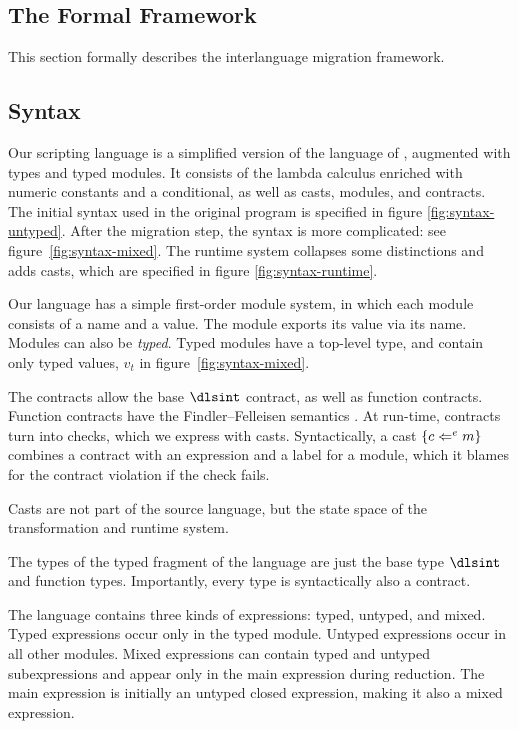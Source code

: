 \begin{schemeregion}
\section{The Formal Framework}\label{sec:dls-formal}

This section formally describes the interlanguage migration framework.
\subsection{Syntax}

Our scripting language is a simplified version of the language of
\citet{mff:popl06}, augmented with types and typed
modules.  It consists of the lambda calculus enriched with numeric
constants and a conditional, as well as casts, modules, and
contracts. The initial syntax used in the original program is specified in
figure \ref{fig:syntax-untyped}.  After the migration step, the syntax
is more complicated: see figure~\ref{fig:syntax-mixed}.  The runtime
system collapses some distinctions and adds casts, which are specified
in figure \ref{fig:syntax-runtime}.

 Our language has a simple first-order module system,
in which each module consists of a name and a value. The module
exports its value via its name. Modules can also be \emph{typed}. 
Typed modules have a top-level type, and contain only typed
values, $v_t$ in figure~\ref{fig:syntax-mixed}.

 The contracts allow the base $\dlsint$
contract, as well as function contracts.  Function
contracts have the Findler--Felleisen semantics \cite{ff:ho-contracts}.
At run-time, contracts turn into checks, which we express with casts.
Syntactically, a cast $\{c \Leftarrow^{e} m\}$ combines a contract with an
expression and a label for a module, which it blames for the contract
violation if the check fails.

Casts are not part of the source language, but the state space of the
transformation and runtime system.

 The types of the typed fragment of the language are just
the base type $\dlsint$ and function types. Importantly, every type is
syntactically also a contract.  

 The language contains three kinds of
expressions: typed, untyped, and mixed.  Typed expressions occur only
in the typed module.  Untyped expressions occur in all other modules.
Mixed expressions can contain typed and untyped subexpressions and
appear only in the main expression during reduction.  The main
expression is initially an untyped closed expression, making it also a
mixed expression.


\end{schemeregion}
